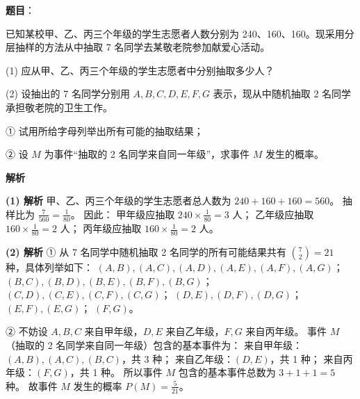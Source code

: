 \begin{answer}

\textbf{题目}：

已知某校甲、乙、丙三个年级的学生志愿者人数分别为 240、160、160。现采用分层抽样的方法从中抽取 7 名同学去某敬老院参加献爱心活动。

(1) 应从甲、乙、丙三个年级的学生志愿者中分别抽取多少人？

(2) 设抽出的 7 名同学分别用 $A,B,C,D,E,F,G$ 表示，现从中随机抽取 2 名同学承担敬老院的卫生工作。

① 试用所给字母列举出所有可能的抽取结果；

② 设 $M$ 为事件“抽取的 2 名同学来自同一年级”，求事件 $M$ 发生的概率。

\textbf{解析}

\textbf{(1) 解析} 甲、乙、丙三个年级的学生志愿者总人数为 $240+160+160=560$。
抽样比为 $\frac{7}{560}=\frac{1}{80}$。
因此：
甲年级应抽取 $240\times\frac{1}{80}=3$ 人；
乙年级应抽取 $160\times\frac{1}{80}=2$ 人；
丙年级应抽取 $160\times\frac{1}{80}=2$ 人。

\textbf{(2) 解析} ① 从 7 名同学中随机抽取 2 名同学的所有可能结果共有 $\binom72=21$ 种，具体列举如下：
$(A,B),(A,C),(A,D),(A,E),(A,F),(A,G)$；
$(B,C),(B,D),(B,E),(B,F),(B,G)$；
$(C,D),(C,E),(C,F),(C,G)$；
$(D,E),(D,F),(D,G)$；
$(E,F),(E,G)$；
$(F,G)$。

② 不妨设 $A,B,C$ 来自甲年级，$D,E$ 来自乙年级，$F,G$ 来自丙年级。
事件 $M$（抽取的 2 名同学来自同一年级）包含的基本事件为：
来自甲年级：$(A,B),(A,C),(B,C)$，共 3 种；
来自乙年级：$(D,E)$，共 1 种；
来自丙年级：$(F,G)$，共 1 种。
所以事件 $M$ 包含的基本事件总数为 $3+1+1=5$ 种。
故事件 $M$ 发生的概率 $P(M)=\frac{5}{21}$。



\end{answer}
